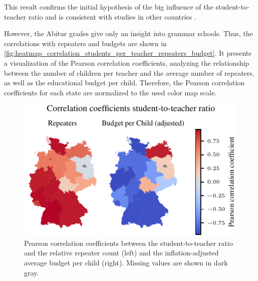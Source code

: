 This result confirms the initial hypothesis of the big influence of the student-to-teacher ratio and is consistent with studies in other countries \cite{kasau_onesmus_mulei_pupil-teacher_2016,koc_impact_2015,dickson_economic_1984}.

However, the Abitur grades give only an insight into grammar schools. 
Thus, the correlations with repeaters and budgets are shown in \autoref{fig:heatmap_correlation_students_per_teacher_repeaters_budget}. 
It presents a visualization of the Pearson correlation coefficients, analyzing the relationship between the number of children per teacher and the average number of repeaters, as well as the educational budget per child. 
Therefore, the Pearson correlation coefficients for each state are normalized to the used color map scale.

\begin{figure}[ht]
    \centering
    \includegraphics{fig/fig_heatmap_correlation_students_per_teacher_repeaters_budget.pdf}
    \caption{Pearson correlation coefficients between the student-to-teacher ratio and the relative repeater count (left) and the inflation-adjusted average budget per child (right). Missing values are shown in \textcolor{TUdark}{dark gray}.}
    \label{fig:heatmap_correlation_students_per_teacher_repeaters_budget}
\end{figure}

